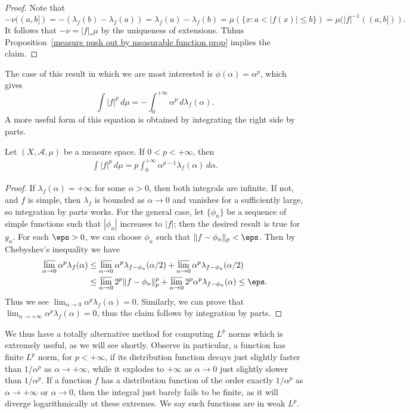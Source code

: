 \begin{proof}
Note that
\[-\nu((a,b])=-(\lambda_f(b)-\lambda_f(a))=\lambda_f(a)-\lambda_f(b)=\mu(\{x:a<|f(x)|\leq b\})=\mu(|f|^{-1}((a,b])).\]
It follows that $-\nu=|f|_*\mu$ by the uniqueness of extensions. Thhus Proposition~\ref{measure push out by measurable function prop} implies the claim.
\end{proof}
The case of this result in which we are most interested is $\phi(\alpha)=\alpha^p$, which gives
\[\int|f|^p\,d\mu=-\int_{0}^{+\infty}\alpha^p\,d\lambda_f(\alpha).\]
A more useful form of this equation is obtained by integrating the right side by parts.
\begin{corollary}
Let $(X,\mathcal{A},\mu)$ be a measure space. If $0<p<+\infty$, then
\begin{align}\label{L^p norm integral by distribution}
\int|f|^p\,d\mu=p\int_0^{+\infty}\alpha^{p-1}\lambda_f(\alpha)\,d\alpha.\end{align}
\end{corollary}
\begin{proof}
If $\lambda_f(\alpha)=+\infty$ for some $\alpha>0$, then both integrals are infinite. If not, and $f$ is simple, then $\lambda_f$ is bounded as $\alpha\to 0$ and vanishes for a sufficiently large, so integration by parts works. For the general case, let $\{\phi_n\}$ be a sequence of simple functions such that $|\phi_n|$ increases to $|f|$; then the desired result is true for $g_n$. For each $\eps>0$, we can choose $\phi_n$ such that $\|f-\phi_n\|_p<\eps$. Then by Chebyshev's inequality we have
\begin{align*}
\varlimsup_{\alpha\to 0}\alpha^p\lambda_f(\alpha)&\leq\varlimsup_{\alpha\to 0}\alpha^p\lambda_{f-\phi_n}(\alpha/2)+\varlimsup_{\alpha\to 0}\alpha^p\lambda_{f-\phi_n}(\alpha/2)\\
&\leq\varlimsup_{\alpha\to 0}2^p\|f-\phi_n\|_p^p+\varlimsup_{\alpha\to 0}2^p\alpha^p\lambda_{f-\phi_n}(\alpha)\leq\eps.
\end{align*}
Thus we see $\lim_{\alpha\to 0}\alpha^p\lambda_f(\alpha)=0$. Similarly, we can prove that $\lim_{\alpha\to+\infty}\alpha^p\lambda_{f}(\alpha)=0$, thus the claim follows by integration by parts.
\end{proof}
We thus have a totally alternative method for computing $L^p$ norms which is extremely useful, as we will see shortly. Observe in particular, a function has finite $L^p$ norm, for $p<+\infty$, if its distribution function decays just slightly faster than $1/\alpha^p$ as $\alpha\to+\infty$, while it explodes to $+\infty$ as $\alpha\to 0$ just slightly slower than $1/\alpha^p$. If a function $f$ has a distribution function of the order exactly $1/\alpha^p$ as $\alpha\to+\infty$ or $\alpha\to 0$, then the integral just barely fails to be finite, as it will diverge logarithmically at these extremes. We say such functions are in weak $L^p$.\par

